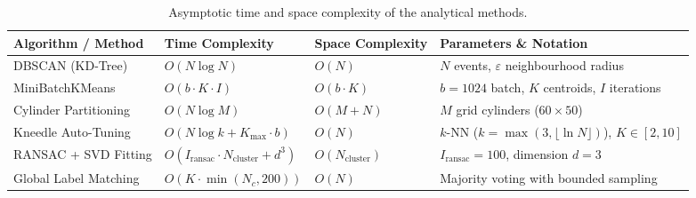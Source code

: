 \begin{table}[H]
\centering
\caption{Asymptotic time and space complexity of the analytical methods.}
\label{tab:complexity}
\scriptsize
\setlength{\tabcolsep}{2.5pt}
\renewcommand{\arraystretch}{0.90}
\begin{tabularx}{\textwidth}{@{}l l l >{\raggedright\arraybackslash}X@{}}
\toprule
\textbf{Algorithm / Method} & \textbf{Time Complexity} & \textbf{Space Complexity} & \textbf{Parameters \& Notation} \\
\midrule
DBSCAN (KD-Tree) & $O(N \log N)$ & $O(N)$ & $N$ events, $\varepsilon$ neighbourhood radius \\
MiniBatchKMeans & $O(b \cdot K \cdot I)$ & $O(b \cdot K)$ & $b=1024$ batch, $K$ centroids, $I$ iterations \\
Cylinder Partitioning & $O(N \log M)$ & $O(M + N)$ & $M$ grid cylinders ($60 \times 50$) \\
Kneedle Auto-Tuning & $O(N \log k + K_\text{max} \cdot b)$ & $O(N)$ & $k$-NN ($k = \max(3, \lfloor \ln N \rfloor)$), $K \in [2, 10]$ \\
RANSAC + SVD Fitting & $O(I_\text{ransac} \cdot N_\text{cluster} + d^3)$ & $O(N_\text{cluster})$ & $I_\text{ransac}=100$, dimension $d=3$ \\
Global Label Matching & $O(K \cdot \min(N_c, 200))$ & $O(N)$ & Majority voting with bounded sampling \\
\bottomrule
\end{tabularx}
\end{table}
